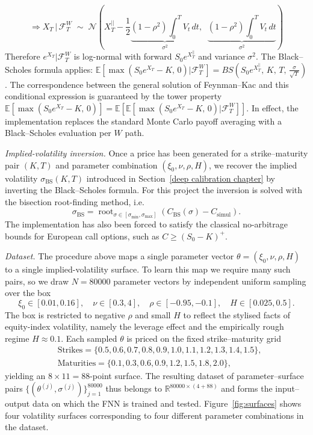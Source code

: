 \documentclass[12pt,a4paper]{article}
\theoremstyle{remark} \newtheorem{remark}[theorem]{Remark}
\begin{document}
\[\Rightarrow 
X_T\,|\,\mathcal{F}^W_T \;\sim\; \mathcal{N}\!\left(X_T^{||} - \frac{1}{2}\underbrace{(1-\rho^2)\int_0^T V_t\,dt}_{\sigma^2},\;\; \underbrace{(1-\rho^2)\int_0^T V_t\,dt}_{\sigma^2}\right)
\]
Therefore $e^{X_T}|\mathcal{F}^W_T$ is log-normal with forward $S_0 e^{X_T^{||}}$ and variance $\sigma^2$. The Black--Scholes formula applies: $
\mathbb{E}\!\left[\max\!\left(S_0 e^{X_T} - K,\,0\right)\Big|\mathcal{F}^W_T\right] = BS\!\left(S_0 e^{X_T^{||}},\,K,\,T,\,\frac{\sigma}{\sqrt{T}}\right)$. The correspondence between the general solution of Feynman--Kac and this conditional expression is guaranteed by the tower property $
\mathbb{E}\!\left[\max\!\left(S_0 e^{X_T} - K,\,0\right)\right] = \mathbb{E}\!\left[\mathbb{E}\!\left[\max\!\left(S_0 e^{X_T} - K,\,0\right)\Big|\mathcal{F}^W_T\right]\right]$.
In effect, the implementation replaces the standard Monte Carlo payoff averaging with a Black--Scholes evaluation per $W$ path.

\textit{Implied-volatility inversion.} Once a price has been generated for a strike--maturity pair $(K,T)$ and parameter combination $(\xi_0,\nu,\rho,H)$, we recover the implied volatility $\sigma_{\mathrm{BS}}(K,T)$ introduced in Section~\ref{deep calibration chapter} by inverting the Black--Scholes formula. For this project the inversion is solved with the bisection root-finding method, i.e.
\[
\sigma_{\mathrm{BS}}
=
\operatorname{root}_{\sigma\in[\sigma_{\min},\sigma_{\max}]}
\left(C_{\mathrm{BS}}(\sigma)-C_{\mathrm{simul}}\right).
\]
The implementation has also been forced to satisfy the classical no-arbitrage bounds for European call options, such as $C\geq(S_0-K)^+$.

\textit{Dataset.} The procedure above maps a single parameter vector $\theta=(\xi_0,\nu,\rho,H)$ to a single implied-volatility surface. To learn this map we require many such pairs, so we draw $N=80000$ parameter vectors by independent uniform sampling over the box
\[
\xi_0\in[0.01,0.16],\quad
\nu\in[0.3,4],\quad
\rho\in[-0.95,-0.1],\quad
H\in[0.025,0.5].
\]
The box is restricted to negative $\rho$ and small $H$ to reflect the stylised facts of equity-index volatility, namely the leverage effect and the empirically rough regime $H\approx0.1$. Each sampled $\theta$ is priced on the fixed strike--maturity grid
\begin{align*}
&\text{Strikes}
=
\{0.5,0.6,0.7,0.8,0.9,1.0,1.1,1.2,1.3,1.4,1.5\},\\
&\text{Maturities}
=
\{0.1,0.3,0.6,0.9,1.2,1.5,1.8,2.0\},
\end{align*}
yielding an $8\times11=88$-point surface. The resulting dataset of parameter--surface pairs $\{(\theta^{(j)},\sigma^{(j)})\}_{j=1}^{80000}$ thus belongs to $\mathbb{R}^{80000\times (4+88)}$ and forms the input--output data on which the FNN is trained and tested. Figure~\ref{fig:surfaces} shows four volatility surfaces corresponding to four different parameter combinations in the dataset.
\end{document}

